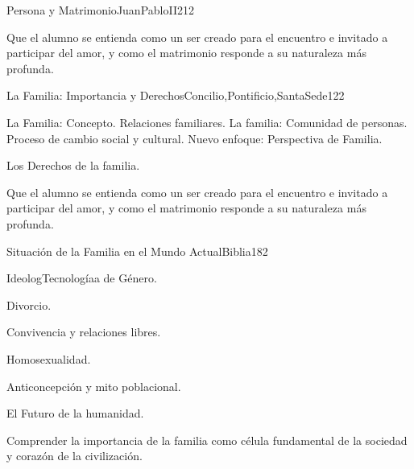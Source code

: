 \begin{syllabus}
\begin{unit}{Persona y Matrimonio}{JuanPabloII}{21}{2}
\begin{unitgoals}
	\item Que el alumno se entienda como un ser creado para el encuentro e invitado a participar del amor, y como el matrimonio responde a su naturaleza más profunda.  
\end{unitgoals}
\end{unit}

\begin{unit}{La Familia: Importancia y Derechos}{Concilio,Pontificio,SantaSede}{12}{2}
\begin{topics}
	\item La Familia: Concepto. Relaciones familiares. La familia: Comunidad de personas. Proceso de cambio social y cultural. Nuevo enfoque: Perspectiva de Familia.
	\item Los Derechos de la familia.	
\end{topics}

\begin{unitgoals}
	\item Que el alumno se entienda como un ser creado para el encuentro e invitado a participar del amor, y como el matrimonio responde a su naturaleza más profunda.  
\end{unitgoals}
\end{unit}

\begin{unit}{Situación de la Familia en el Mundo Actual}{Biblia}{18}{2}
\begin{topics}
	\item IdeologTecnologíaa de Género.
	\item Divorcio.
	\item Convivencia y relaciones libres.
	\item Homosexualidad.
	\item Anticoncepción y mito poblacional.
	\item El Futuro de la humanidad.

\end{topics}

\begin{unitgoals}
	\item Comprender la importancia de la familia como célula fundamental de la sociedad y corazón de la civilización.
\end{unitgoals}
\end{unit}



\begin{coursebibliography}
\end{coursebibliography}

\end{syllabus}
